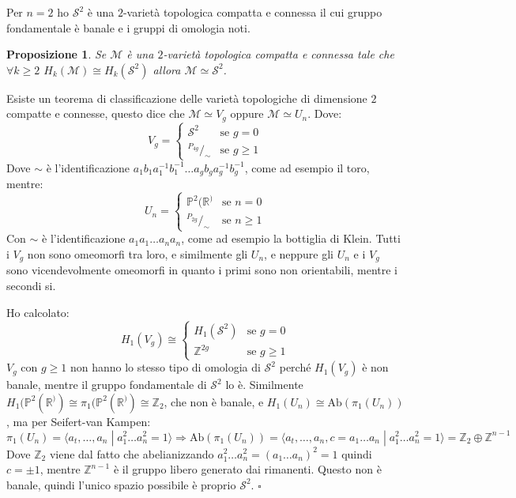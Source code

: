 \documentclass[10pt, twoside=false, x11names]{scrbook}
\newtheorem{proposition}[theorem]{Proposizione}
\newenvironment{proof}{{\textbf{Dimostrazione}:}}{\hfill $\square$}
\newcommand{\M}{\mathcal{M}}
\newcommand{\Z}{\mathbb{Z}}
\newcommand{\RN}[1][]{\mathbb{R}^#1}
\newcommand{\Sph}[1][]{\mathcal{S}^#1}
\newcommand{\Ab}[1]{\mathrm{Ab}\left( #1 \right)}
\newcommand*\quot[2]{{^{\textstyle #1}\big/_{\textstyle #2}}}
\begin{document}
Per $ n = 2 $ ho $ \Sph{2} $ è una $ 2 $-varietà topologica compatta e connessa
il cui gruppo fondamentale è banale e i gruppi di omologia noti.

\begin{proposition}
  Se $ \M $ è una $ 2 $-varietà topologica compatta e connessa tale che $ \forall k \geq 2 $
  $ H_k(\M) \cong H_k(\Sph{2}) $ allora $ \M \simeq \Sph{2} $.
\end{proposition}
\begin{proof}
  Esiste un teorema di classificazione delle varietà topologiche di dimensione $ 2 $
  compatte e connesse, questo dice che $ \M \simeq V_g $ oppure $ \M \simeq U_n $.
  Dove:
  \[
    V_g =
    \begin{cases}
      \Sph{2} & \text{se } g = 0 \\
      \quot{P_{4g}}{\sim} & \text{se } g \geq 1
    \end{cases}
  \]
  Dove $ \sim $ è l'identificazione $ a_1 b_1 a_1^{-1}b_1^{-1}\dots a_g b_g a_g^{-1}b_g^{-1} $,
  come ad esempio il toro, mentre:
  \[
    U_n =
    \begin{cases}
      \mathbb{P}^2(\RN) & \text{se } n = 0 \\
      \quot{P_{2g}}{\sim} & \text{se } n \geq 1
    \end{cases}
  \]
  Con $ \sim $ è l'identificazione $ a_1 a_1 \dots a_n a_n $, come ad esempio
  la bottiglia di Klein.
  Tutti i $ V_g $ non sono omeomorfi tra loro, e similmente gli $ U_n $, e neppure
  gli $ U_n $ e i $ V_g $ sono vicendevolmente omeomorfi in quanto i primi sono
  non orientabili, mentre i secondi si.

  Ho calcolato:
  \[
    H_1(V_g) \cong
    \begin{cases}
      H_1(\Sph{2}) & \text{se } g = 0 \\
      \Z^{2g} & \text{se } g \geq 1
    \end{cases}
  \]
  $ V_g $ con $ g \geq 1 $ non hanno lo stesso tipo di omologia di $ \Sph{2} $ perché
  $ H_1(V_g) $ è non banale, mentre il gruppo fondamentale di $ \Sph{2} $ lo è.
  Similmente $ H_1(\mathbb{P}^2(\RN)) \cong \pi_1(\mathbb{P}^2(\RN)) \cong \Z_2 $, che non è
  banale, e $ H_1(U_n) \cong \Ab{\pi_1(U_n)} $, ma per Seifert-van Kampen:
  \[
    \pi_1(U_n) = \langle a_t, \dots, a_n \; | \; a_1^2\dots a_n^2 = 1 \rangle \Rightarrow \Ab{\pi_1(U_n)} = \langle a_t, \dots, a_n, c = a_1 \dots a_n \; | \; a_1^2\dots a_n^2 = 1 \rangle =
    \Z_2 \oplus \Z^{n-1}
  \]
  Dove $ \Z_2 $ viene dal fatto che abelianizzando $ a_1^2\dots a_n^2 = (a_1 \dots a_n)^2 = 1 $ quindi
  $ c = \pm 1 $, mentre $ \Z^{n-1} $ è il gruppo libero generato dai rimanenti.
  Questo non è banale, quindi l'unico spazio possibile è proprio $ \Sph{2} $.
\end{proof}
\end{document}

